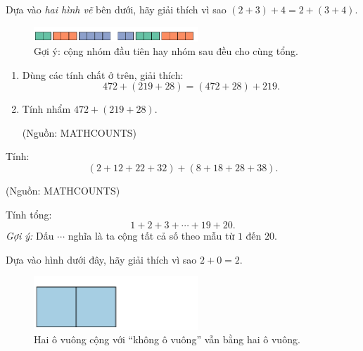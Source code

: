\begin{problem}[1.2]
Dựa vào \emph{hai hình vẽ} bên dưới, hãy giải thích vì sao
$(2+3)+4=2+(3+4)$.

\begin{figure}[ht!]
  \centering
  \includegraphics[width=0.55\textwidth]{img/fig-prob1.2.pdf}
  \caption*{\small Gợi ý: cộng nhóm đầu tiên hay nhóm sau đều cho cùng tổng.}
\end{figure}
\end{problem}

\begin{problem}[1.3]
\begin{enumerate}[label=(\alph*)]
  \item Dùng các tính chất ở trên, giải thích:
  \[
  472+(219+28)=(472+28)+219.
  \]
  \item Tính nhẩm $472+(219+28)$.
  \begin{flushright}\small(Nguồn: MATHCOUNTS)\end{flushright}
\end{enumerate}
\end{problem}

\begin{problem}[1.4]
Tính:
\[
(2+12+22+32)+(8+18+28+38).
\]
\begin{flushright}\small(Nguồn: MATHCOUNTS)\end{flushright}
\end{problem}

\begin{problem}[1.5]
Tính tổng:
\[
1+2+3+\cdots+19+20.
\]
\textit{Gợi ý:} Dấu \texttt{$\cdots$} nghĩa là ta cộng tất cả số theo
mẫu từ $1$ đến $20$.
\end{problem}


\begin{problem}[1.6]
Dựa vào hình dưới đây, hãy giải thích vì sao $2 + 0 = 2$.

\begin{figure}[ht!]
  \centering
  \includegraphics[width=0.55\textwidth]{img/fig-prob1.6.pdf}
  \caption*{\small Hai ô vuông cộng với “không ô vuông” vẫn bằng hai ô vuông.}
\end{figure}
\end{problem}


